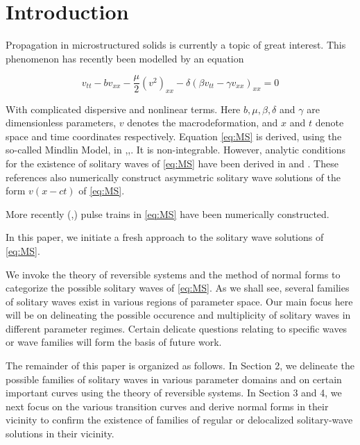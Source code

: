 \section{Introduction}

Propagation in microstructured solids is currently a topic of great interest. This phenomenon has
recently been modelled \cite{STE} by an equation

\begin{equation}\label{eq:MS}
v_{tt} - b v_{xx} - \frac{\mu}{2} \left( v^2 \right)_{xx} - \delta \left( \beta v_{tt} - \gamma v_{xx}\right)_{xx} = 0 
\end{equation}

With complicated dispersive and nonlinear terms. Here $b, \mu, \beta, \delta$ and $\gamma$ are dimensionless
parameters, $v$ denotes the macrodeformation, and $x$ and $t$ denote space and time coordinates respectively.
Equation \eqref{eq:MS} is derived, using the so-called Mindlin Model, in \cite{JE1},\cite{JE2},\cite{STE}. 
It is non-integrable. However, analytic conditions for the existence of solitary waves of \eqref{eq:MS} have been 
derived in \cite{JE2} and \cite{STE}. These references also numerically construct asymmetric solitary wave solutions of the form $ v\left(x - c t \right)$ of \eqref{eq:MS}.

More recently (\cite{EP},\cite{EBS}) pulse trains in \eqref{eq:MS} have been numerically constructed.

In this paper, we initiate a fresh approach to the solitary wave solutions of \eqref{eq:MS}.

We invoke the theory of reversible systems and the method of normal forms to categorize the possible solitary waves of \eqref{eq:MS}.
As we shall see, several families of solitary waves exist in various regions of parameter space. Our main focus here will be on 
delineating the possible occurence and multiplicity of solitary waves in different parameter regimes. Certain delicate questions
relating to specific waves or wave families will form the basis of future work. 

The remainder of this paper is organized as follows. In Section 2, we delineate the possible families of solitary waves
in various parameter domains and on certain important curves using the theory of reversible systems. In Section 3 and 4, we next
focus on the various transition curves and derive normal forms in their vicinity to confirm the existence of families of 
regular or delocalized solitary-wave solutions in their vicinity.
